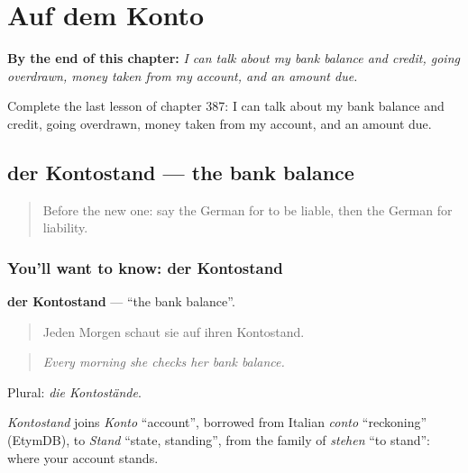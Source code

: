 
\chapter{Auf dem Konto}
\label{ch:ge-auf-dem-konto}

\begin{chapteropening}
\textbf{By the end of this chapter:} \emph{I can talk about my bank balance and credit, going overdrawn, money taken from my account, and an amount due.}

Complete the last lesson of chapter 387: I can talk about my bank balance and credit, going overdrawn, money taken from my account, and an amount due.
\end{chapteropening}

\section[der Kontostand]{der Kontostand — the bank balance}

\label{lesson:GE-C387-kontostand}



\begin{quote}
Before the new one: say the German for to be liable, then the German for liability.
\end{quote}

\subsection*{You'll want to know: der Kontostand}
\textbf{der Kontostand} — \textquotedblleft{}the bank balance\textquotedblright{}.

\begin{quote}
Jeden Morgen schaut sie auf ihren Kontostand.
\end{quote}

\begin{quote}
\emph{Every morning she checks her bank balance.}
\end{quote}

Plural: \emph{die Kontostände}.

\begin{cousinweb}
\emph{Kontostand} joins \emph{Konto} \textquotedblleft{}account\textquotedblright{}, borrowed from Italian \emph{conto} \textquotedblleft{}reckoning\textquotedblright{} (EtymDB), to \emph{Stand} \textquotedblleft{}state, standing\textquotedblright{}, from the family of \emph{stehen} \textquotedblleft{}to stand\textquotedblright{}: where your account stands.
\end{cousinweb}

